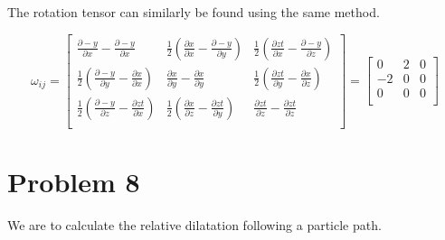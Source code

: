 \documentclass[11pt,a4paper,english]{article}
\numberwithin{equation}{section}
\begin{document}
The rotation tensor can similarly be found using the same method.     
     
     \[\omega_{ij}=
\begin{bmatrix}
       \frac{\partial -y}{\partial x} - \frac{\partial -y}{\partial x} & 
       \frac{1}{2}(\frac{\partial x}{\partial x} - \frac{\partial -y}{\partial y}) & 
       \frac{1}{2}(\frac{\partial zt}{\partial x} - \frac{\partial -y}{\partial z}) \\[0.3em]
       
       \frac{1}{2}(\frac{\partial -y}{\partial y} - \frac{\partial x}{\partial x}) & 
       \frac{\partial x}{\partial y} - \frac{\partial x}{\partial y} & 
       \frac{1}{2}(\frac{\partial zt}{\partial y} - \frac{\partial x}{\partial z}) \\[0.3em]
      
       \frac{1}{2}(\frac{\partial -y}{\partial z} - \frac{\partial zt}{\partial x}) & 
       \frac{1}{2}(\frac{\partial x}{\partial z} - \frac{\partial zt}{\partial y}) & 
       \frac{\partial zt}{\partial z} - \frac{\partial zt}{\partial z} \\[0.3em]
     \end{bmatrix}
     =\begin{bmatrix}
       0 & 
       2 & 
       0\\[0.3em]
       
       -2 & 
       0 & 
       0\\[0.3em]
       
       0 & 
       0 & 
       0\\[0.3em]
     \end{bmatrix}\]

\section{Problem 8}
We are to calculate the relative dilatation following a particle path.
\end{document}
